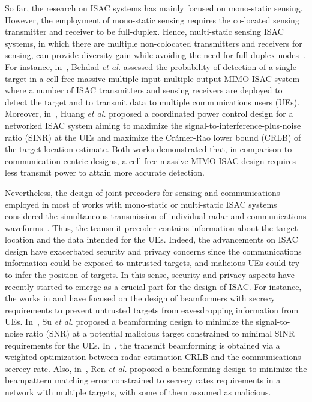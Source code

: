\documentclass[conference,twocolumn,a4paper]{IEEEtran}
\theoremstyle{remark} \newtheorem{remark}{Remark}
\begin{document}
So far, the research on ISAC systems has mainly focused on mono-static sensing. However, the employment of mono-static sensing requires the co-located sensing transmitter and receiver to be full-duplex. Hence, multi-static sensing ISAC systems, in which there are multiple non-colocated transmitters and receivers for sensing, can provide diversity gain while avoiding the need for full-duplex nodes~\cite{Art:Emil}. For instance, in~\cite{Art:Emil}, Behdad \textit{et al.} assessed the probability of detection of a single target in a cell-free massive multiple-input multiple-output MIMO ISAC system where a number of ISAC transmitters and sensing receivers are deployed to detect the target and to transmit data to multiple communications users (UEs). Moreover, in~\cite{9842350}, Huang \textit{et al.} proposed a coordinated power control design for a networked ISAC system aiming to maximize the signal-to-interference-plus-noise ratio (SINR) at the UEs and maximize the Cr\'{a}mer-Rao lower bound (CRLB) of the target location estimate. Both works demonstrated that, in comparison to communication-centric designs, a cell-free massive MIMO ISAC design requires less transmit power to attain more accurate detection.

Nevertheless, the design of joint precoders for sensing and communications employed in most of works with mono-static or multi-static ISAC systems considered the simultaneous transmission of individual radar and communications waveforms~\cite{9124713,demirhan2023cell}. Thus, the transmit precoder contains information about the target location and the data intended for the UEs. Indeed, the advancements on ISAC design have exacerbated security and privacy concerns since the communications information could be exposed to untrusted targets, and malicious UEs could try to infer the position of targets. In this sense, security and privacy aspects have recently started to emerge as a crucial part for the design of ISAC. For instance, the works in \cite{art:su2021, 10104579} and \cite{art:ren} have focused on the design of beamformers with secrecy requirements to prevent untrusted targets from eavesdropping information from UEs. In~\cite{art:su2021}, Su \textit{et al.} proposed a beamforming design to minimize the signal-to-noise ratio (SNR) at a potential malicious target constrained to minimal SINR requirements for the UEs. In~\cite{10104579}, the transmit beamforming is obtained via a weighted optimization between radar estimation CRLB and the communications secrecy rate. Also, in~\cite{art:ren}, Ren \textit{et al.} proposed a beamforming design to minimize the beampattern matching error constrained to secrecy rates requirements in a network with multiple targets, with some of them assumed as malicious.
\end{document}
